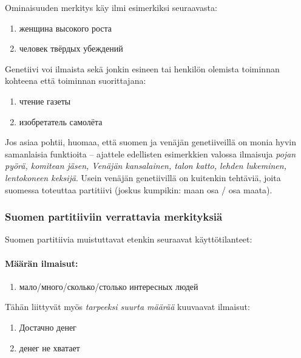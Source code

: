 \documentclass[]{scrartcl}
\providecommand{\tightlist}{%
  \setlength{\itemsep}{0pt}\setlength{\parskip}{0pt}}
\begin{document}
Ominaisuuden merkitys käy ilmi esimerkiksi seuraavasta:

\begin{enumerate}
\def\labelenumi{(\arabic{enumi})}
\setcounter{enumi}{30}
\tightlist
\item
  женщина высокого роста
\item
  человек твёрдых убеждений
\end{enumerate}

Genetiivi voi ilmaista sekä jonkin esineen tai henkilön olemista
toiminnan kohteena että toiminnan suorittajana:

\begin{enumerate}
\def\labelenumi{(\arabic{enumi})}
\setcounter{enumi}{32}
\tightlist
\item
  чтение газеты
\item
  изобретатель самолёта
\end{enumerate}

Jos asiaa pohtii, huomaa, että suomen ja venäjän genetiiveillä on monia
hyvin samanlaisia funktioita -- ajattele edellisten esimerkkien valossa
ilmaisuja \emph{pojan pyörä, komitean jäsen, Venäjän kansalainen, talon
katto, lehden lukeminen, lentokoneen keksijä}. Usein venäjän
genetiivillä on kuitenkin tehtäviä, joita suomessa toteuttaa partitiivi
(joskus kumpikin: maan osa / osa maata).

\subsubsection{Suomen partitiiviin verrattavia
merkityksiä}\label{suomen-partitiiviin-verrattavia-merkityksiuxe4}

Suomen partitiivia muistuttavat etenkin seuraavat käyttötilanteet:

\paragraph{Määrän ilmaisut:}\label{muxe4uxe4ruxe4n-ilmaisut}

\begin{enumerate}
\def\labelenumi{(\arabic{enumi})}
\setcounter{enumi}{34}
\tightlist
\item
  мало/много/сколько/столько интересных людей
\end{enumerate}

Tähän liittyvät myös \emph{tarpeeksi suurta määrää} kuuvaavat ilmaisut:

\begin{enumerate}
\def\labelenumi{(\arabic{enumi})}
\setcounter{enumi}{35}
\tightlist
\item
  Достачно денег
\item
  денег не хватает
\end{enumerate}
\end{document}
